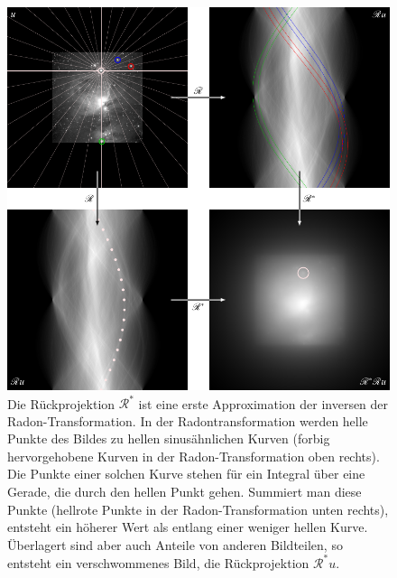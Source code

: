 %
%
%
\begin{figure}
\centering
\includegraphics[width=\textwidth]{chapters/050-radon/images/rueckprojektion.pdf}
\caption{Die Rückprojektion $\mathscr{R}^*$ ist eine erste Approximation
der inversen der Radon-Transformation.
In der Radontransformation werden helle Punkte des Bildes zu hellen
sinusähnlichen Kurven (forbig hervorgehobene Kurven in der Radon-Transformation
oben rechts).
Die Punkte einer solchen Kurve stehen für ein Integral über eine
Gerade, die durch den hellen Punkt gehen.
Summiert man diese Punkte (hellrote Punkte in der Radon-Transformation
unten rechts), entsteht ein höherer Wert als entlang einer weniger hellen
Kurve.
Überlagert sind aber auch Anteile von anderen Bildteilen, so entsteht
ein verschwommenes Bild, die Rückprojektion $\mathscr{R}^*u$.
\label{buch:radon:rueckprojektion:fig:rueckprojektion}}
\end{figure}
